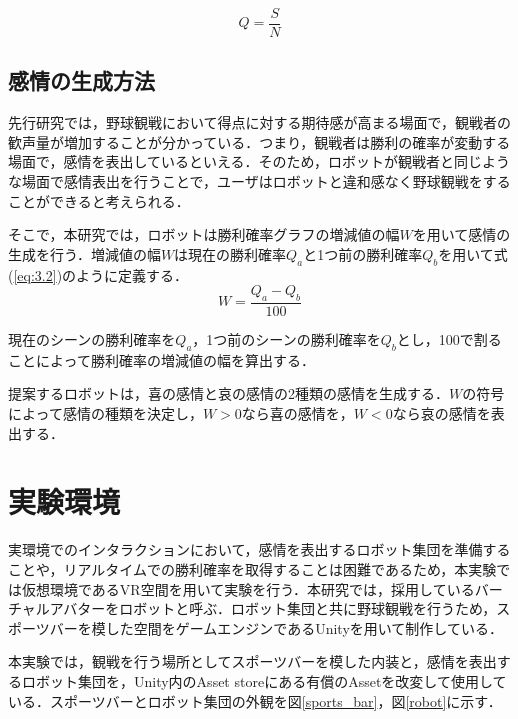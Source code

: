 \begin{equation}
\label{eq:3.1}
　Q = \frac{S}{N}
\end{equation}





\subsection{感情の生成方法}
\label{sec3.1.2}

先行研究では，野球観戦において得点に対する期待感が高まる場面で，観戦者の歓声量が増加することが分かっている\cite{rinjyo3}．つまり，観戦者は勝利の確率が変動する場面で，感情を表出しているといえる．そのため，ロボットが観戦者と同じような場面で感情表出を行うことで，ユーザはロボットと違和感なく野球観戦をすることができると考えられる．

そこで，本研究では，ロボットは勝利確率グラフの増減値の幅$W$を用いて感情の生成を行う．増減値の幅$W$は現在の勝利確率$Q_{a}$と1つ前の勝利確率$Q_{b}$を用いて式(\ref{eq:3.2})のように定義する．
\begin{equation}
\label{eq:3.2}
　W = \frac{Q_{a}-Q_{b}}{100}
\end{equation}

現在のシーンの勝利確率を$Q_{a}$，1つ前のシーンの勝利確率を$Q_{b}$とし，100で割ることによって勝利確率の増減値の幅を算出する．

提案するロボットは，喜の感情と哀の感情の2種類の感情を生成する．$W$の符号によって感情の種類を決定し，$W > 0$なら喜の感情を，$W < 0$なら哀の感情を表出する．


\newpage

\section{実験環境}
\label{sec3.2}

実環境でのインタラクションにおいて，感情を表出するロボット集団を準備することや，リアルタイムでの勝利確率を取得することは困難であるため，本実験では仮想環境であるVR空間を用いて実験を行う．本研究では，採用しているバーチャルアバターをロボットと呼ぶ．ロボット集団と共に野球観戦を行うため，スポーツバーを模した空間をゲームエンジンであるUnityを用いて制作している\cite{unity}．

本実験では，観戦を行う場所としてスポーツバーを模した内装と，感情を表出するロボット集団を，Unity内のAsset storeにある有償のAssetを改変して使用している\cite{bar}\cite{lilrobot}．スポーツバーとロボット集団の外観を図\ref{sports_bar}，図\ref{robot}に示す．

